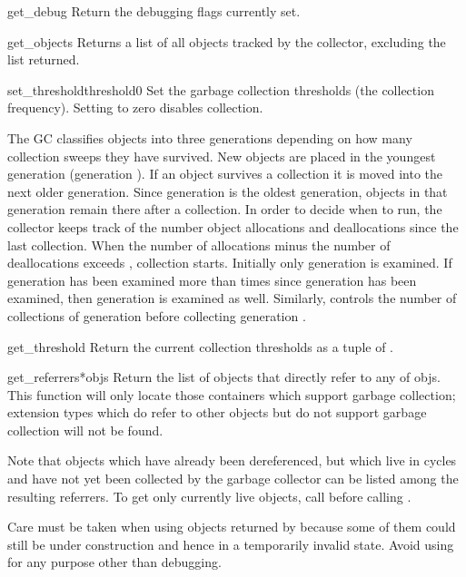 \begin{funcdesc}{get_debug}{}
Return the debugging flags currently set.
\end{funcdesc}

\begin{funcdesc}{get_objects}{}
Returns a list of all objects tracked by the collector, excluding the
list returned.
\end{funcdesc}

\begin{funcdesc}{set_threshold}{threshold0}
Set the garbage collection thresholds (the collection frequency).
Setting  to zero disables collection.

The GC classifies objects into three generations depending on how many
collection sweeps they have survived.  New objects are placed in the
youngest generation (generation ).  If an object survives a
collection it is moved into the next older generation.  Since
generation  is the oldest generation, objects in that
generation remain there after a collection.  In order to decide when
to run, the collector keeps track of the number object allocations and
deallocations since the last collection.  When the number of
allocations minus the number of deallocations exceeds
, collection starts.  Initially only generation
 is examined.  If generation  has been examined more
than  times since generation  has been
examined, then generation  is examined as well.  Similarly,
 controls the number of collections of generation
 before collecting generation .
\end{funcdesc}

\begin{funcdesc}{get_threshold}{}
Return the current collection thresholds as a tuple of
.
\end{funcdesc}

\begin{funcdesc}{get_referrers}{*objs}
Return the list of objects that directly refer to any of objs. This
function will only locate those containers which support garbage
collection; extension types which do refer to other objects but do not
support garbage collection will not be found.

Note that objects which have already been dereferenced, but which live
in cycles and have not yet been collected by the garbage collector can
be listed among the resulting referrers.  To get only currently live
objects, call  before calling
.

Care must be taken when using objects returned by
 because some of them could still be under
construction and hence in a temporarily invalid state. Avoid using
 for any purpose other than debugging.

\end{funcdesc}

